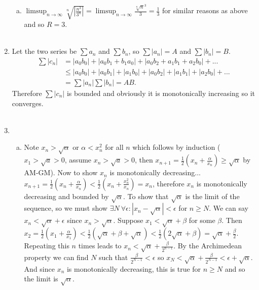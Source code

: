 \documentclass{article}
\begin{document}
\begin{enumerate}
\begin{enumerate}[(a)]
\item $\displaystyle\limsup_{n\rightarrow\infty} \sqrt[n]{\left|\frac{n^3}{3^n}\right|}=\displaystyle\limsup_{n\rightarrow\infty} \frac{\sqrt[n]{n}^3}{3} = \frac{1}{3}$ for similar reasons as above and so $R=3$.
\\
\\
\end{enumerate}
\setcounter{enumi}{12}
\item Let the two series be $\sum{a_n}$ and $\sum{b_n}$, so $\sum{|a_n|}=A$ and $\sum{|b_n|}=B$.\\
\begin{align*}
\sum{|c_{n}|}&=|a_{0}b_{0}|+|a_{0}b_{1}+b_{1}a_{0}|+|a_{0}b_{2}+a_{1}b_{1}+a_{2}b_{0}|+...\\
&\leq |a_0b_0|+|a_0b_1|+|a_1b_0|+|a_{0}b_{2}|+|a_{1}b_{1}|+|a_{2}b_{0}|+...\\
&=\sum{|a_n|}\sum{|b_n|}=AB.
\end{align*}
Therefore $\sum{|c_{n}|}$ is bounded and obviously it is monotonically increasing so it converges.
\setcounter{enumi}{15}
\\
\\
\item 
\begin{enumerate}[(a)]
\item Note $x_n > \sqrt{\alpha}$ or $\alpha < x_n^2$ for all $n$ which follows by induction ($x_1 > \sqrt{a} > 0$, assume $x_n > \sqrt{a} > 0$, then $x_{n+1} = \frac{1}{2}\left(x_n+\frac{\alpha}{x_n}\right) \geq \sqrt{\alpha}$ by AM-GM). Now to show $x_n$ is monotonically decreasing... $x_{n+1} = \displaystyle\frac{1}{2}\left(x_n +\frac{\alpha}{x_n}
\right) < \displaystyle\frac{1}{2}\left(x_n + \frac{x_n^2}{x_n}\right) = x_n$, therefore $x_n$ is monotonically decreasing and bounded by $\sqrt{\alpha}$. To show that $\sqrt{\alpha}$ is the limit of the sequence, so we must show $\exists N \ \forall \epsilon: |x_{n}-\sqrt{\alpha}| < \epsilon$ for $n\geq N$. We can say $x_n < \sqrt{\alpha} + \epsilon$ since $x_n > \sqrt{\alpha}$. Suppose $x_1 < \sqrt{\alpha}+ \beta$ for some $\beta$. Then $x_2 = \displaystyle\frac{1}{2}\left(x_1 + \frac{\alpha}{x_1}\right) < \frac{1}{2}(\sqrt{\alpha}+\beta+\sqrt{\alpha}) < \frac{1}{2} (2\sqrt{\alpha}+\beta) = \sqrt{\alpha}+\frac{\beta}{2}$. Repeating this $n$ times leads to $x_n < \sqrt{\alpha}+\displaystyle\frac{\beta}{2^{n-1}}$. By the Archimedean property we can find $N$ such that $\displaystyle\frac{\beta}{2^{N-1}} < \epsilon $ so $x_N < \sqrt{\alpha}+\displaystyle\frac{\beta}{2^{N-1}} < \epsilon+\sqrt{\alpha}$. And since $x_n$ is monotonically decreasing, this is true for $n\geq N$ and so the limit is $\sqrt{\alpha}$.

\end{enumerate}
\end{enumerate}
\end{document}
